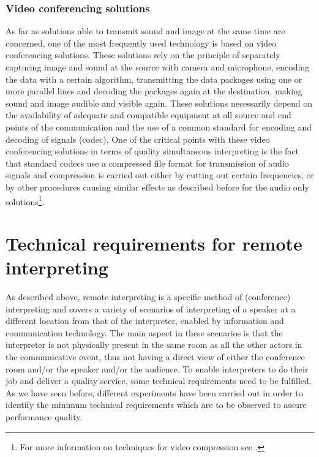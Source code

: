 \documentclass[output=paper]{langsci/langscibook}
\begin{document}
\subsubsection{Video conferencing solutions}
\label{sub:ziegler:4.4}
As far as solutions able to transmit sound and image at the same time are concerned, one of the most frequently used technology is based on video conferencing solutions. These solutions rely on the principle of separately capturing image and sound at the source with camera and microphone, encoding the data with a certain algorithm, transmitting the data packages using one or more parallel lines and decoding the packages again at the destination, making sound and image audible and visible again. These solutions necessarily depend on the availability of adequate and compatible equipment at all source and end points of the communication and the use of a common standard for encoding and decoding of signals (codec). One of the critical points with these video conferencing solutions in terms of quality simultaneous interpreting is the fact that standard codecs use a compressed file format for transmission of audio signals and compression is carried out either by cutting out certain frequencies, or by other procedures causing similar effects as described before for the audio only solutions\footnote{For more information on techniques for video compression see \citet{Wiegand2003}.}.

\section{Technical requirements for remote interpreting}
\label{sec:ziegler:05}
As described above, remote interpreting is a specific method of (conference) interpreting and covers a variety of scenarios of interpreting of a speaker at a different location from that of the interpreter, enabled by information and communication technology. The main aspect in these scenarios is that the interpreter is not physically present in the same room as all the other actors in the communicative event, thus not having a direct view of either the conference room and/or the speaker and/or the audience. To enable interpreters to do their job and deliver a quality service, some technical requirements need to be fulfilled. As we have seen before, different experiments have been carried out in order to identify the minimum technical requirements which are to be observed to assure performance quality.
\end{document}

